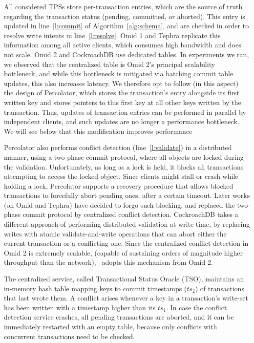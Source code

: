 All considered TPSs store per-transaction entries, which are the source of truth regarding the transaction status (pending, committed, or aborted). 
This entry is updated in line~\ref{l:commit} of Algorithm~\ref{alg:schema}, and are checked in order to resolve write intents in line~\ref{l:resolve}.
Omid 1 and Tephra replicate this information among all active clients, which consumes high bandwidth and does not scale. Omid 2 and 
CockroachDB use dedicated tables. In experiments we ran, we observed that the centralized table is Omid 2's principal scalability bottleneck, and while this bottleneck is mitigated via batching commit table updates, this also increases latency. 
We therefore opt to follow (in this aspect) the design of Percolator, which stores the transaction's entry alongside its first written key and stores pointers to this first key at all other keys written by the transaction. Thus, updates of transaction entries can be performed in parallel by 
independent clients, and such updates are no longer a performance bottleneck. 
We will see below that this modification improves performance 

Percolator also performs conflict detection (line~\ref{l:validate}) in a distributed manner, using a two-phase commit protocol, where all objects are locked during the validation.  Unfortunately, as long as a lock is held, it blocks all transactions attempting to access the locked object. Since clients might stall or 
crash while holding a lock, Percolator supports a recovery procedure that allows blocked transactions to forcefully abort pending ones, 
after a certain timeout. Later works (on Omid and Tephra) have decided to forgo such blocking, and replaced the two-phase commit protocol by 
centralized conflict detection. CockroachDB takes a different approach of performing distributed validation at write time, by replacing writes with atomic validate-and-write operations that can abort either the current transaction or a conflicting one. Since the centralized conflict detection in Omid 2 is extremely scalable, (capable of sustaining orders of magnitude higher throughput than the network), 
\sys\ adopts this mechanism from Omid 2. 

The centralized service, called Transactional Status Oracle (TSO), maintains an in-memory hash table mapping keys to 
commit timestamps ($ts_2$) of transactions that last wrote them. A conflict arises whenever a key in a transaction's write-set has been written 
with a timestamp higher than its $ts_1$. 
In case the conflict detection service crashes, all pending transactions are aborted, and it can be immediately restarted with an empty table, because only conflicts with concurrent transactions need to be checked. 

